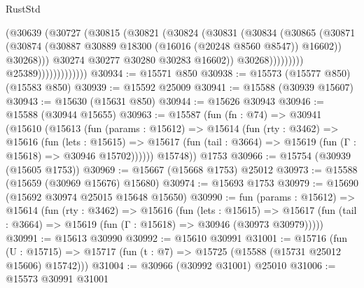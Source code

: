 \begin{lexlean}{RustStd}
\begin{coremodule}
                                        (@30639
                                          (@30727
                                            (@30815
                                              (@30821
                                                (@30824
                                                  (@30831
                                                    (@30834
                                                      (@30865
                                                        (@30871
                                                          (@30874
                                                            (@30887
                                                              @30889
                                                              @18300
                                                              (@16016 (@20248 @8560 @8547))
                                                              @16602))
                                                          @30268)))
                                                    @30274
                                                    @30277
                                                    @30280
                                                    @30283
                                                    @16602))
                                                @30268)))))))))
                              @25389)))))))))))))
@30934 := @15571 @850
@30938 := @15573 (@15577 @850) (@15583 @850)
@30939 := @15592 @25009
@30941 := @15588 (@30939 @15607)
@30943 := @15630 (@15631 @850)
@30944 := @15626 @30943
@30946 := @15588 (@30944 @15655)
@30963 := @15587
    (fun (fn : @74) =>
    @30941
      (@15610
        (@15613
          (fun (params : @15612) =>
          @15614
            (fun (rty : @3462) =>
            @15616
              (fun (lets : @15615) =>
              @15617 (fun (tail : @3664) => @15619 (fun (Γ : @15618) => @30946 @15702))))))
        @15748))
    @1753
@30966 := @15754 (@30939 (@15605 @1753))
@30969 := @15667 (@15668 @1753) @25012
@30973 := @15588 (@15659 (@30969 @15676) @15680)
@30974 := @15693 @1753
@30979 := @15690 (@15692 @30974 @25015 @15648 @15650)
@30990 := fun (params : @15612) =>
  @15614
    (fun (rty : @3462) =>
    @15616
      (fun (lets : @15615) =>
      @15617 (fun (tail : @3664) => @15619 (fun (Γ : @15618) => @30946 (@30973 @30979)))))
@30991 := @15613 @30990
@30992 := @15610 @30991
@31001 := @15716
    (fun (U : @15715) => @15717 (fun (t : @7) => @15725 (@15588 (@15731 @25012 @15606) @15742)))
@31004 := @30966 (@30992 @31001) @25010
@31006 := @15573 @30991 @31001

\end{coremodule}
\end{lexlean}
